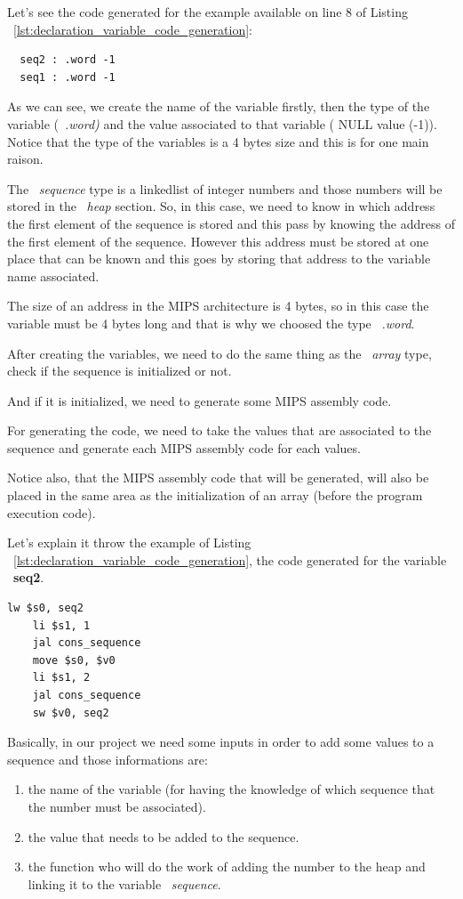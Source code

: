 \documentclass[
  oneside,
  11pt, a4paper,
  footinclude=true,
  headinclude=true,
  cleardoublepage=empty
]{scrbook}
\begin{document}
Let's see the code generated for the example available on line 8 of Listing ~\ref{lst:declaration_variable_code_generation}:

\begin{lstlisting}
  seq2 : .word -1		
  seq1 : .word -1		
\end{lstlisting}

As we can see, we create the name of the variable firstly, then the type of the variable (~\textit{.word)} and the value associated to that variable ( NULL value (-1)). Notice that the type of the variables is a 4 bytes size and this is for one main raison.

The ~\textit{sequence} type is a linkedlist of integer numbers and those numbers will be stored in the ~\textit{heap} section.
So, in this case, we need to know in which address the first element of the sequence is stored and this pass by knowing the address of the first element of the sequence. However this address must be stored at one place that can be known and this goes by storing that address to the variable name associated.

The size of an address in the MIPS architecture is 4 bytes, so in this case the variable must be 4 bytes long and that is why we choosed the type ~\textit{.word}.

After creating the variables, we need to do the same thing as the ~\textit{array} type, check if the sequence is initialized or not.

And if it is initialized, we need to generate some MIPS assembly code. 

For generating the code, we need to take the values that are associated to the sequence and generate each MIPS assembly code for each values.

Notice also, that the MIPS assembly code that will be generated, will also be placed in the same area as the initialization of an array (before the program execution code).

Let's explain it throw the example of Listing ~\ref{lst:declaration_variable_code_generation}, the code generated for the variable ~\textbf{seq2}.

\begin{lstlisting}[caption={Code generated for the sequence variable},label={lst:sequence_initialization_mips}]
 	lw $s0, seq2		
	li $s1, 1		
	jal cons_sequence		
	move $s0, $v0		
	li $s1, 2		
	jal cons_sequence		
	sw $v0, seq2		
\end{lstlisting}

Basically, in our project we need some  inputs in order to add some values to a sequence and those informations are:
\begin{enumerate}
\item the name of the variable (for having the knowledge of which sequence that the number must be associated).
\item the value that needs to be added to the sequence.
\item the function who will do the work of adding the number to the heap and linking it to the variable ~\textit{sequence}.
\end{enumerate}
\end{document}
